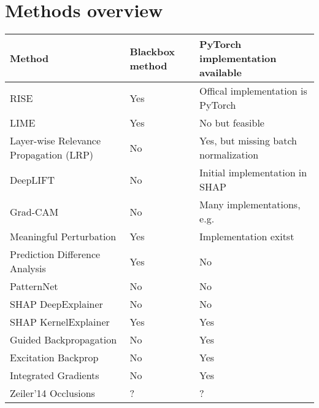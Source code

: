 \section{Methods overview}

\begin{tabular}{| p{7cm} | p{2.5cm} | p{6cm} | }
\hline
\textbf{Method} & \textbf{Blackbox method} & \textbf{PyTorch implementation available} \\ \hline

RISE \cite{Petsiuk2018rise} & Yes & Offical implementation is PyTorch \\ \hline
LIME \cite{ribeiro2016should} & Yes & No but feasible \\ \hline
Layer-wise Relevance Propagation (LRP) \cite{bach2015pixel} & No & Yes, but missing batch normalization \cite{lrppytorch} \\ \hline
DeepLIFT \cite{shrikumar2017learning} & No & Initial implementation in SHAP \cite{NIPS2017_7062} \\ \hline
Grad-CAM \cite{selvaraju2017grad} & No & Many implementations, e.g. \cite{visualattribution} \\ \hline
Meaningful Perturbation \cite{fong2017interpretable} & Yes & Implementation exitst  \cite{fong2017implementation} \\ \hline
Prediction Difference Analysis \cite{zintgraf2017visualizing} & Yes & No \\ \hline
PatternNet & No & No \\ \hline
SHAP DeepExplainer \cite{NIPS2017_7062} & No & No \\ \hline
SHAP KernelExplainer \cite{NIPS2017_7062} & Yes & Yes \\ \hline
Guided Backpropagation \cite{springenberg2014striving}  & No & Yes \cite{visualattribution} \\ \hline
Excitation Backprop \cite{zhang2016EB} & No & Yes \cite{visualattribution} \\ \hline
Integrated Gradients \cite{sundararajan2017axiomatic} & No & Yes \cite{integratedgradientpytorch}  \\ \hline
Zeiler'14 Occlusions & ? & ? \\ \hline
\end{tabular}

